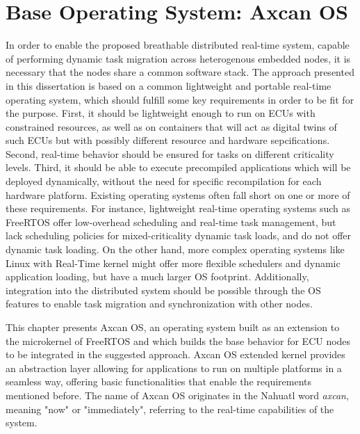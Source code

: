 
\chapter{Base Operating System: Axcan OS}\label{chap:os}

In order to enable the proposed breathable distributed real-time system, capable of performing dynamic task migration across heterogenous embedded nodes, it is necessary that the nodes share a common software stack. The approach presented in this dissertation is based on a common lightweight and portable real-time operating system, which should fulfill some key requirements in order to be fit for the purpose. First, it should be lightweight enough to run on ECUs with constrained resources, as well as on containers that will act as digital twins of such ECUs but with possibly different resource and hardware sepcifications. Second, real-time behavior should be ensured for tasks on different criticality levels. Third, it should be able to execute precompiled applications which will be deployed dynamically, without the need for specific recompilation for each hardware platform. Existing operating systems often fall short on one or more of these requirements. For instance, lightweight real-time operating systems such as FreeRTOS offer low-overhead scheduling and real-time task management, but lack scheduling policies for mixed-criticality dynamic task loads, and do not offer dynamic task loading. On the other hand, more complex operating systems like Linux with Real-Time kernel might offer more flexible schedulers and dynamic application loading, but have a much larger OS footprint. Additionally, integration into the distributed system should be possible through the OS features to enable task migration and synchronization with other nodes.

This chapter presents Axcan OS, an operating system built as an extension to the microkernel of FreeRTOS and which builds the base behavior for ECU nodes to be integrated in the suggested approach. Axcan OS extended kernel provides an abstraction layer allowing for applications to run on multiple platforms in a seamless way, offering basic functionalities that enable the requirements mentioned before. The name of Axcan OS originates in the Nahuatl word \textit{axcan}, meaning "now" or "immediately", referring to the real-time capabilities of the system.

